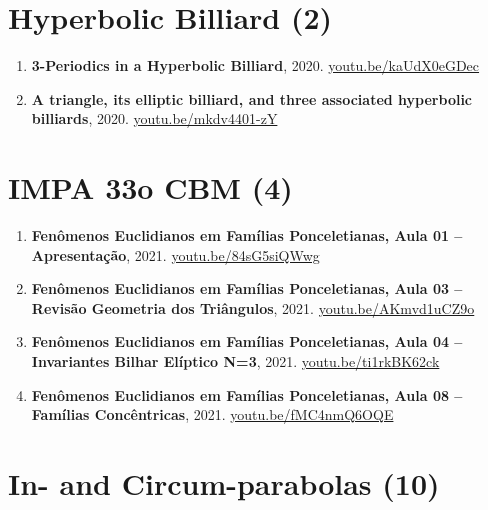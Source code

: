 \documentclass[12pt]{article}
\begin{document}
\section{Hyperbolic Billiard (2)}

\begin{enumerate}[resume]
\item \textbf{3-Periodics in a Hyperbolic Billiard}, 2020. \href{https://youtu.be/kaUdX0eGDec}{\url{youtu.be/kaUdX0eGDec}}
\item \textbf{A triangle, its elliptic billiard, and three associated hyperbolic billiards}, 2020. \href{https://youtu.be/mkdv4401-zY}{\url{youtu.be/mkdv4401-zY}}
\end{enumerate}

\section{IMPA 33o CBM (4)}

\begin{enumerate}[resume]
\item \textbf{Fenômenos Euclidianos em Famílias Ponceletianas, Aula 01 -- Apresentação}, 2021. \href{https://youtu.be/84sG5siQWwg}{\url{youtu.be/84sG5siQWwg}}
\item \textbf{Fenômenos Euclidianos em Famílias Ponceletianas, Aula 03 -- Revisão Geometria dos Triângulos}, 2021. \href{https://youtu.be/AKmvd1uCZ9o}{\url{youtu.be/AKmvd1uCZ9o}}
\item \textbf{Fenômenos Euclidianos em Famílias Ponceletianas, Aula 04 -- Invariantes Bilhar Elíptico N=3}, 2021. \href{https://youtu.be/ti1rkBK62ck}{\url{youtu.be/ti1rkBK62ck}}
\item \textbf{Fenômenos Euclidianos em Famílias Ponceletianas, Aula 08 -- Famílias Concêntricas}, 2021. \href{https://youtu.be/fMC4nmQ6OQE}{\url{youtu.be/fMC4nmQ6OQE}}
\end{enumerate}

\section{In- and Circum-parabolas (10)}
\end{document}
